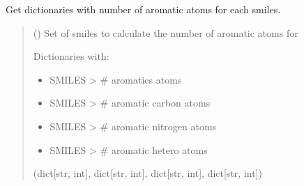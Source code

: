 \documentclass[letterpaper,10pt,english]{sphinxmanual}
\begin{document}
\begin{fulllineitems}
\label{\detokenize{add_rdkit_compound_descriptors:add_rdkit_compound_descriptors.calculate_aromatic_atoms}}
\pysigstartsignatures
{}
\pysigstopsignatures
\sphinxAtStartPar
Get dictionaries with number of aromatic atoms for each smiles.
\begin{quote}\begin{description}
\sphinxAtStartPar
{} (\sphinxstyleliteralemphasis{\sphinxupquote{{[}}}\sphinxstyleliteralemphasis{\sphinxupquote{{]}}}) \textendash{} Set of smiles to calculate the number of aromatic atoms for

\sphinxAtStartPar

\sphinxAtStartPar
Dictionaries with:
\begin{itemize}
\item {} 
\sphinxAtStartPar
SMILES \sphinxhyphen{}\textgreater{} \# aromatics atoms

\item {} 
\sphinxAtStartPar
SMILES \sphinxhyphen{}\textgreater{} \# aromatic carbon atoms

\item {} 
\sphinxAtStartPar
SMILES \sphinxhyphen{}\textgreater{} \# aromatic nitrogen atoms

\item {} 
\sphinxAtStartPar
SMILES \sphinxhyphen{}\textgreater{} \# aromatic hetero atoms

\end{itemize}


\sphinxAtStartPar
(dict{[}str, int{]}, dict{[}str, int{]}, dict{[}str, int{]}, dict{[}str, int{]})

\end{description}\end{quote}

\end{fulllineitems}
\end{document}
